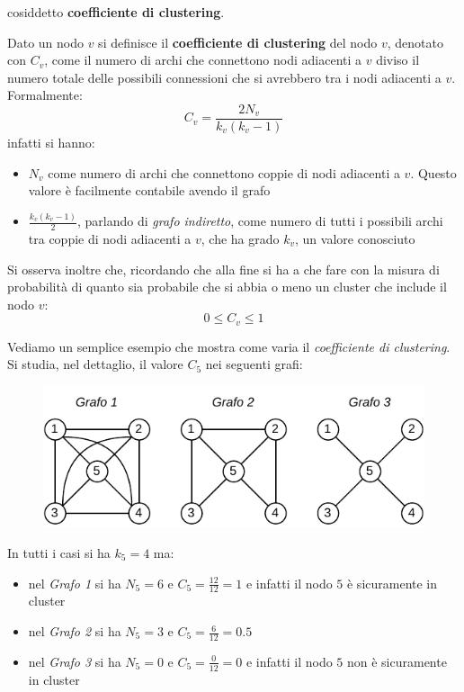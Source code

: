 \documentclass[a4paper,12pt, oneside]{book}
\begin{document}
cosiddetto \textbf{coefficiente di clustering}.
\begin{definizione}
  Dato un nodo $v$ si definisce il \textbf{coefficiente di clustering} del nodo
  $v$, denotato con $C_v$, come il numero di archi che connettono nodi adiacenti
  a $v$ diviso il numero totale delle possibili connessioni che si avrebbero tra
  i nodi adiacenti a $v$. Formalmente:
  \[C_v=\frac{2N_v}{k_v(k_v-1)}\]
  infatti si hanno:
  \begin{itemize}
    \item $N_v$ come numero di archi che connettono coppie di nodi adiacenti a
    $v$. Questo valore è facilmente contabile avendo il grafo
    \item $\frac{k_v(k_v-1)}{2}$, parlando di \textit{grafo indiretto}, come
    numero di tutti i possibili archi tra 
    coppie di nodi adiacenti a $v$, che ha grado $k_v$, un valore conosciuto
  \end{itemize}
  Si osserva inoltre che, ricordando che alla fine si ha a che fare con la
  misura di probabilità di quanto sia probabile che si abbia o meno un cluster
  che include il nodo $v$:
  \[0\leq C_v\leq 1\]
\end{definizione}
\begin{esempio}
  Vediamo un semplice esempio che mostra come varia il \textit{coefficiente di
    clustering}. Si studia, nel dettaglio, il valore $C_5$ nei seguenti grafi:
  \begin{figure}[H]
    \centering
    \includegraphics[scale = 1.3]{img/clus.pdf}
  \end{figure}
  In tutti i casi si ha $k_5=4$ ma:
  \begin{itemize}
    \item nel \textit{Grafo 1} si ha $N_5=6$ e $C_5=\frac{12}{12}=1$ e infatti
    il nodo $5$ è sicuramente in cluster
    \item nel \textit{Grafo 2} si ha $N_5=3$ e $C_5=\frac{6}{12}=0.5$
    \item nel \textit{Grafo 3} si ha $N_5=0$ e $C_5=\frac{0}{12}=0$ e infatti il
    nodo $5$ non è sicuramente in cluster
  \end{itemize}
\end{esempio}
\end{document}
